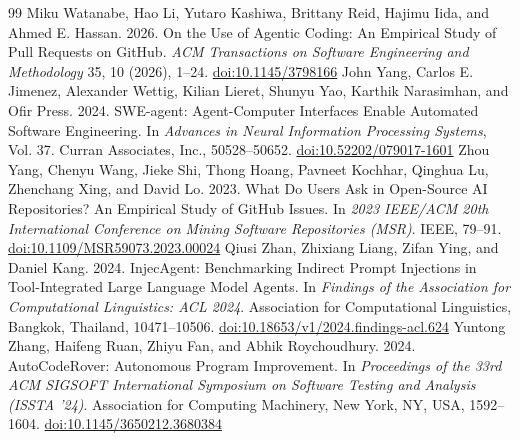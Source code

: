 \documentclass[acmsmall,screen,nonacm]{acmart}
\providecommand{\doi}[1]{\href{https://doi.org/#1}{doi:#1}}
\begin{document}
\begin{thebibliography}{99}
 Miku Watanabe, Hao Li, Yutaro Kashiwa, Brittany Reid, Hajimu Iida, and Ahmed E. Hassan. 2026. On the Use of Agentic Coding: An Empirical Study of Pull Requests on GitHub. \emph{ACM Transactions on Software Engineering and Methodology} 35, 10 (2026), 1--24. \doi{10.1145/3798166}
 John Yang, Carlos E. Jimenez, Alexander Wettig, Kilian Lieret, Shunyu Yao, Karthik Narasimhan, and Ofir Press. 2024. SWE-agent: Agent-Computer Interfaces Enable Automated Software Engineering. In \emph{Advances in Neural Information Processing Systems}, Vol. 37. Curran Associates, Inc., 50528--50652. \doi{10.52202/079017-1601}
 Zhou Yang, Chenyu Wang, Jieke Shi, Thong Hoang, Pavneet Kochhar, Qinghua Lu, Zhenchang Xing, and David Lo. 2023. What Do Users Ask in Open-Source AI Repositories? An Empirical Study of GitHub Issues. In \emph{2023 IEEE/ACM 20th International Conference on Mining Software Repositories (MSR)}. IEEE, 79--91. \doi{10.1109/MSR59073.2023.00024}
 Qiusi Zhan, Zhixiang Liang, Zifan Ying, and Daniel Kang. 2024. InjecAgent: Benchmarking Indirect Prompt Injections in Tool-Integrated Large Language Model Agents. In \emph{Findings of the Association for Computational Linguistics: ACL 2024}. Association for Computational Linguistics, Bangkok, Thailand, 10471--10506. \doi{10.18653/v1/2024.findings-acl.624}
 Yuntong Zhang, Haifeng Ruan, Zhiyu Fan, and Abhik Roychoudhury. 2024. AutoCodeRover: Autonomous Program Improvement. In \emph{Proceedings of the 33rd ACM SIGSOFT International Symposium on Software Testing and Analysis (ISSTA '24)}. Association for Computing Machinery, New York, NY, USA, 1592--1604. \doi{10.1145/3650212.3680384}
\end{thebibliography}
\endgroup


\end{document}
